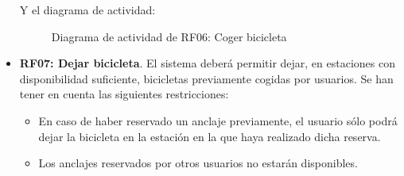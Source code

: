 \begin{itemize}
	\FloatBarrier
	Y el diagrama de actividad:
	\begin{figure}[!htb]
		\centering
		\caption{Diagrama de actividad de RF06: Coger bicicleta}
		\label{fig:diagramaActividad_RF06}
	\end{figure}
	
	\FloatBarrier
	\item \textbf{RF07: Dejar bicicleta}. El sistema deberá permitir dejar, en estaciones con disponibilidad suficiente, bicicletas previamente cogidas por usuarios. Se han tener en cuenta las siguientes restricciones:
	\begin{itemize}
		\item En caso de haber reservado un anclaje previamente, el usuario sólo podrá dejar la bicicleta en la estación en la que haya realizado dicha reserva.
		\item Los anclajes reservados por otros usuarios no estarán disponibles.
	\end{itemize}
	

\end{itemize}
